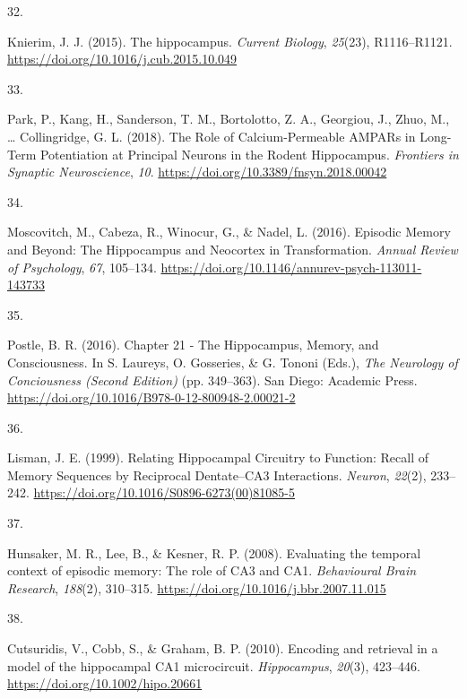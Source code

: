 \documentclass[
  11pt,
  letterpaper,
]{scrreprt}
\newlength{\cslhangindent}
\newlength{\csllabelwidth}
\newenvironment{CSLReferences}[2] %
 {\begin{list}{}{%
  \setlength{\itemindent}{0pt}
  \setlength{\leftmargin}{0pt}
  \setlength{\parsep}{0pt}
  \ifodd #1
   \setlength{\leftmargin}{\cslhangindent}
   \setlength{\itemindent}{-1\cslhangindent}
  \fi
  \setlength{\itemsep}{#2\baselineskip}}}
 {\end{list}}
\newcommand{\CSLLeftMargin}[1]{\parbox[t]{\csllabelwidth}{\strut#1\strut}}
\newcommand{\CSLRightInline}[1]{\parbox[t]{\linewidth - \csllabelwidth}{\strut#1\strut}}
\begin{document}
\begin{CSLReferences}{0}{0}
\CSLLeftMargin{32. }%
\CSLRightInline{Knierim, J. J. (2015). The hippocampus. \emph{Current
Biology}, \emph{25}(23), R1116--R1121.
\url{https://doi.org/10.1016/j.cub.2015.10.049}}

\CSLLeftMargin{33. }%
\CSLRightInline{Park, P., Kang, H., Sanderson, T. M., Bortolotto, Z. A.,
Georgiou, J., Zhuo, M., \ldots{} Collingridge, G. L. (2018). The {Role}
of {Calcium-Permeable AMPARs} in {Long-Term Potentiation} at {Principal
Neurons} in the {Rodent Hippocampus}. \emph{Frontiers in Synaptic
Neuroscience}, \emph{10}.
\url{https://doi.org/10.3389/fnsyn.2018.00042}}

\CSLLeftMargin{34. }%
\CSLRightInline{Moscovitch, M., Cabeza, R., Winocur, G., \& Nadel, L.
(2016). Episodic {Memory} and {Beyond}: {The Hippocampus} and
{Neocortex} in {Transformation}. \emph{Annual Review of Psychology},
\emph{67}, 105--134.
\url{https://doi.org/10.1146/annurev-psych-113011-143733}}

\CSLLeftMargin{35. }%
\CSLRightInline{Postle, B. R. (2016). Chapter 21 - {The Hippocampus},
{Memory}, and {Consciousness}. In S. Laureys, O. Gosseries, \& G. Tononi
(Eds.), \emph{The {Neurology} of {Conciousness} ({Second Edition})} (pp.
349--363). San Diego: Academic Press.
\url{https://doi.org/10.1016/B978-0-12-800948-2.00021-2}}

\CSLLeftMargin{36. }%
\CSLRightInline{Lisman, J. E. (1999). Relating {Hippocampal Circuitry}
to {Function}: {Recall} of {Memory Sequences} by {Reciprocal
Dentate}--{CA3 Interactions}. \emph{Neuron}, \emph{22}(2), 233--242.
\url{https://doi.org/10.1016/S0896-6273(00)81085-5}}

\CSLLeftMargin{37. }%
\CSLRightInline{Hunsaker, M. R., Lee, B., \& Kesner, R. P. (2008).
Evaluating the temporal context of episodic memory: {The} role of {CA3}
and {CA1}. \emph{Behavioural Brain Research}, \emph{188}(2), 310--315.
\url{https://doi.org/10.1016/j.bbr.2007.11.015}}

\CSLLeftMargin{38. }%
\CSLRightInline{Cutsuridis, V., Cobb, S., \& Graham, B. P. (2010).
Encoding and retrieval in a model of the hippocampal CA1 microcircuit.
\emph{Hippocampus}, \emph{20}(3), 423--446.
\url{https://doi.org/10.1002/hipo.20661}}


\end{CSLReferences}
\end{document}
